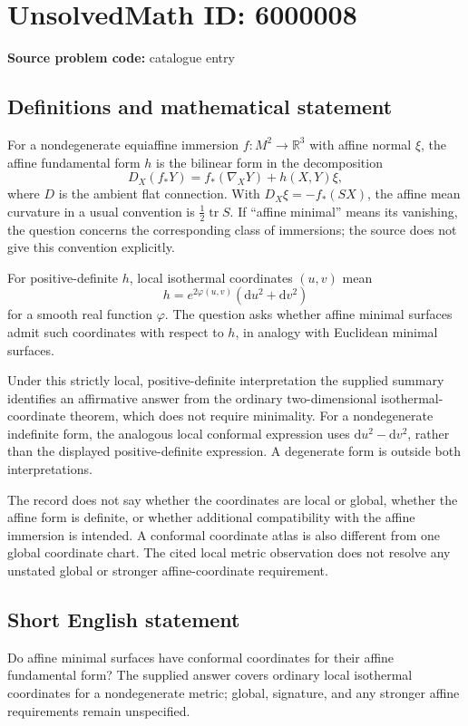 \documentclass[11pt]{article}
\newcommand{\R}{\mathbb{R}}
\begin{document}
\section*{UnsolvedMath ID: 6000008}
\textbf{Source problem code:} catalogue entry
\subsection{Definitions and mathematical statement}
For a nondegenerate equiaffine immersion $f:M^2\to\R^3$ with affine normal $\xi$, the affine fundamental form $h$ is the bilinear form in the decomposition
\[
D_X(f_*Y)=f_*(\nabla_XY)+h(X,Y)\xi,
\]
where $D$ is the ambient flat connection. With $D_X\xi=-f_*(SX)$, the affine mean curvature in a usual convention is $\tfrac12\operatorname{tr}S$. If ``affine minimal'' means its vanishing, the question concerns the corresponding class of immersions; the source does not give this convention explicitly.

For positive-definite $h$, local isothermal coordinates $(u,v)$ mean
\[
h=e^{2\varphi(u,v)}(\mathrm du^2+\mathrm dv^2)
\]
for a smooth real function $\varphi$. The question asks whether affine minimal surfaces admit such coordinates with respect to $h$, in analogy with Euclidean minimal surfaces.

Under this strictly local, positive-definite interpretation the supplied summary identifies an affirmative answer from the ordinary two-dimensional isothermal-coordinate theorem, which does not require minimality. For a nondegenerate indefinite form, the analogous local conformal expression uses $\mathrm du^2-\mathrm dv^2$, rather than the displayed positive-definite expression. A degenerate form is outside both interpretations.

The record does not say whether the coordinates are local or global, whether the affine form is definite, or whether additional compatibility with the affine immersion is intended. A conformal coordinate atlas is also different from one global coordinate chart. The cited local metric observation does not resolve any unstated global or stronger affine-coordinate requirement.
\subsection{Short English statement}
Do affine minimal surfaces have conformal coordinates for their affine fundamental form? The supplied answer covers ordinary local isothermal coordinates for a nondegenerate metric; global, signature, and any stronger affine requirements remain unspecified.
\end{document}
